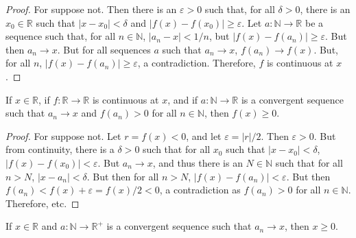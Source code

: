 \documentclass[crop=false,class=book,oneside]{standalone}
\begin{document}
            \begin{proof}
                For suppose not. Then there is an
                $\varepsilon>0$ such that, for all $\delta>0$,
                there is an $x_{0}\in\mathbb{R}$ such that
                $|x-x_{0}|<\delta$ and
                $|f(x)-f(x_{0})|\geq\varepsilon$.
                Let $a:\mathbb{N}\rightarrow\mathbb{R}$
                be a sequence such that, for all
                $n\in\mathbb{N}$, $|a_{n}-x|<1/n$, but
                $|f(x)-f(a_{n})|\geq\varepsilon$.
                But then $a_{n}\rightarrow{x}$. But for all
                sequences $a$ such that $a_{n}\rightarrow{x}$,
                $f(a_{n})\rightarrow{f(x)}$. But, for all $n$,
                $|f(x)-f(a_{n})|\geq\varepsilon$,
                a contradiction.
                Therefore, $f$ is continuous at $x$.
            \end{proof}
            \begin{theorem}
                \label{thm:Funct:Continuous_Limit_%
                       of_Pos_Sequ_is_nonneg}
                If $x\in\mathbb{R}$, if
                $f:\mathbb{R}\rightarrow\mathbb{R}$
                is continuous at $x$, and if
                $a:\mathbb{N}\rightarrow\mathbb{R}$ is a
                convergent sequence such that 
                $a_{n}\rightarrow{x}$ and $f(a_{n})>0$
                for all $n\in\mathbb{N}$, then $f(x)\geq{0}$.
            \end{theorem}
            \begin{proof}
                For suppose not. Let $r=f(x)<0$, and let
                $\varepsilon=|r|/2$. Then $\varepsilon>0$. But
                from continuity, there is a $\delta>0$ such that
                for all $x_{0}$ such that $|x-x_{0}|<\delta$,
                $|f(x)-f(x_{0})|<\varepsilon$. But
                $a_{n}\rightarrow{x}$, and thus there is an
                $N\in\mathbb{N}$ such that for all $n>N$,
                $|x-a_{n}|<\delta$. But then for all $n>N$,
                $|f(x)-f(a_{n})|<\varepsilon$. But then
                $f(a_{n})<f(x)+\varepsilon=f(x)/2<0$,
                a contradiction as $f(a_{n})>0$ for
                all $n\in\mathbb{N}$. Therefore, etc.
            \end{proof}
            \begin{theorem}
                If $x\in\mathbb{R}$ and
                $a:\mathbb{N}\rightarrow\mathbb{R}^{+}$
                is a convergent sequence such that
                $a_{n}\rightarrow{x}$, then $x\geq{0}$.
            \end{theorem}
\end{document}
